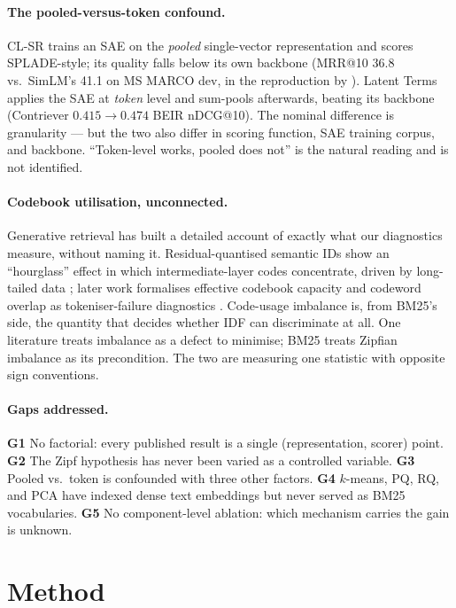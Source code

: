\documentclass[11pt]{article}
\begin{document}
\paragraph{The pooled-versus-token confound.} CL-SR \citep{park2025clsr} trains an SAE on the \emph{pooled} single-vector representation and scores SPLADE-style; its quality falls below its own backbone (MRR@10 36.8 vs.\ SimLM's 41.1 on MS MARCO dev, in the reproduction by \citet{zong2026tokens}). Latent Terms \citep{clavie2026latent} applies the SAE at \emph{token} level and sum-pools afterwards, beating its backbone (Contriever $0.415\!\to\!0.474$ BEIR nDCG@10). The nominal difference is granularity --- but the two also differ in scoring function, SAE training corpus, and backbone. ``Token-level works, pooled does not'' is the natural reading and is not identified.

\paragraph{Codebook utilisation, unconnected.} Generative retrieval has built a detailed account of exactly what our diagnostics measure, without naming it. Residual-quantised semantic IDs show an ``hourglass'' effect in which intermediate-layer codes concentrate, driven by long-tailed data \citep{zhu2024hourglass}; later work formalises effective codebook capacity and codeword overlap as tokeniser-failure diagnostics \citep{wang2026decoupled}. Code-usage imbalance is, from BM25's side, the quantity that decides whether IDF can discriminate at all. One literature treats imbalance as a defect to minimise; BM25 treats Zipfian imbalance as its precondition. The two are measuring one statistic with opposite sign conventions.

\paragraph{Gaps addressed.}
\textbf{G1} No factorial: every published result is a single (representation, scorer) point.
\textbf{G2} The Zipf hypothesis has never been varied as a controlled variable.
\textbf{G3} Pooled vs.\ token is confounded with three other factors.
\textbf{G4} $k$-means, PQ, RQ, and PCA have indexed dense text embeddings but never served as BM25 vocabularies.
\textbf{G5} No component-level ablation: which mechanism carries the gain is unknown.

\section{Method}
\end{document}
